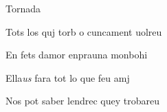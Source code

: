\documentclass[12pt]{article}
\begin{document}
\begin{estrofaExtra}%




\begin{tornada}

\textsection{}Tornada

\end{tornada}


\end{estrofaExtra}


\begin{estrofa}

 Tots los quj torb o cuncament uolreu

 En fets damor enprauna monbohi

 Ella\textit{us} fara tot lo que feu amj

 Nos pot saber lendrec quey trobareu

\end{estrofa}
\end{document}
